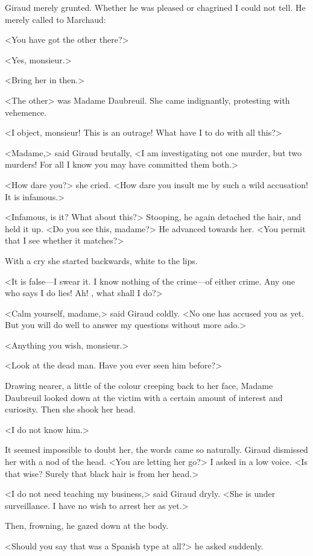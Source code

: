  Giraud merely grunted. Whether he was pleased or chagrined I could not tell. He merely called to Marchaud: 

 <You have got the other there?> 

 <Yes, monsieur.> 

 <Bring her in then.> 

 <The other> was Madame Daubreuil. She came indignantly, protesting with vehemence. 

 <I object, monsieur! This is an outrage! What have I to do with all this?> 

 <Madame,> said Giraud brutally, <I am investigating not one murder, but two murders! For all I know you may have committed them both.> 

 <How dare you?> she cried. <How dare you insult me by such a wild accusation! It is infamous.> 

 <Infamous, is it? What about this?> Stooping, he again detached the hair, and held it up. <Do you see this, madame?> He advanced towards her. <You permit that I see whether it matches?> 

 With a cry she started backwards, white to the lips. 

 <It is false—I swear it. I know nothing of the crime—of either crime. Any one who says I do lies! Ah! , what shall I do?> 

 <Calm yourself, madame,> said Giraud coldly. <No one has accused you as yet. But you will do well to answer my questions without more ado.> 

 <Anything you wish, monsieur.> 

 <Look at the dead man. Have you ever seen him before?> 

 Drawing nearer, a little of the colour creeping back to her face, Madame Daubreuil looked down at the victim with a certain amount of interest and curiosity. Then she shook her head. 

 <I do not know him.> 

 It seemed impossible to doubt her, the words came so naturally. Giraud dismissed her with a nod of the head. <You are letting her go?> I asked in a low voice. <Is that wise? Surely that black hair is from her head.> 

 <I do not need teaching my business,> said Giraud dryly. <She is under surveillance. I have no wish to arrest her as yet.> 

 Then, frowning, he gazed down at the body. 

 <Should you say that was a Spanish type at all?> he asked suddenly. 

